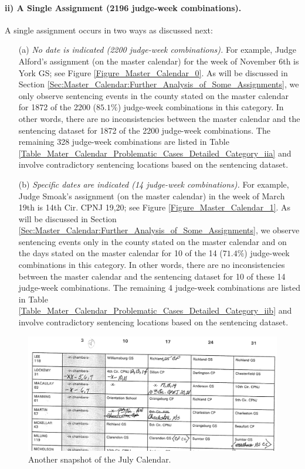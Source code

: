 \documentclass[11pt, oneside]{article}   	%
\theoremstyle{ModifiedStyle}
\begin{document}
\paragraph{ii) A Single Assignment (2196 judge-week combinations).}
\label{Category_ii}
A single assignment occurs in two ways as discussed next:
	\begin{itemize}
		\vspace{-2mm}
		\item[(a)] \emph{No date is indicated (2200 judge-week combinations).} For example, Judge Alford's assignment (on the master calendar) for the week of November 6th is York GS; see Figure \ref{Figure_Master_Calendar_0}. As will be discussed in Section \ref{Sec:Master_Calendar:Further_Analysis_of_Some_Assignments}, we only observe sentencing events in the county stated on the master calendar for 1872 of the 2200 ($85.1\%$) judge-week combinations in this category. In other words, there are no inconsistencies between the master calendar and the sentencing dataset for 1872 of the 2200 judge-week combinations. The remaining 328 judge-week combinations are listed in Table \ref{Table_Mater_Calendar_Problematic_Cases_Detailed_Category_iia} and involve contradictory sentencing locations based on the sentencing dataset.
		\vspace{-2mm}
		\item[(b)] \emph{Specific dates are indicated (14 judge-week combinations).} For example, Judge Smoak's assignment (on the master calendar) in the week of March 19th is 14th Cir. CPNJ 19,20; see Figure \ref{Figure_Master_Calendar_1}. As will be discussed in Section \ref{Sec:Master_Calendar:Further_Analysis_of_Some_Assignments}, we observe sentencing events only in the county stated on the master calendar and on the days stated on the master calendar for 10 of the 14 ($71.4\%$) judge-week combinations in this category. In other words, there are no inconsistencies between the master calendar and the sentencing dataset for 10 of these 14 judge-week combinations. The remaining 4 judge-week combinations are listed in Table \ref{Table_Mater_Calendar_Problematic_Cases_Detailed_Category_iib} and involve contradictory sentencing locations based on the sentencing dataset.
	\end{itemize}

\begin{figure}[ht]
	\centering
	\includegraphics[scale=0.6]{Figures/Fig4}
	\caption{Another snapshot of the July Calendar.}
	\label{Figure_Master_Calendar_4}
\end{figure}
\end{document}
